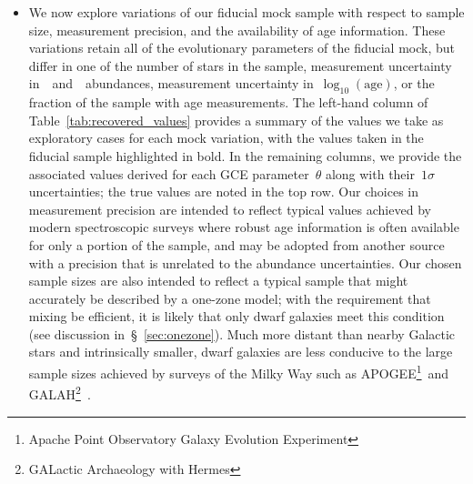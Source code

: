 \documentclass[ms.tex]{subfiles}
\begin{document}
\begin{itemize}

	\item We now explore variations of our fiducial mock sample with respect
	to sample size, measurement precision, and the availability of age
	information.
	These variations retain all of the evolutionary parameters of the fiducial
	mock, but differ in one of the number of stars in the sample, measurement
	uncertainty in~\feh~and~\afe~abundances, measurement uncertainty
	in~$\log_{10}(\text{age})$, or the fraction of the sample with age
	measurements.
	The left-hand column of Table~\ref{tab:recovered_values} provides a summary
	of the values we take as exploratory cases for each mock variation, with
	the values taken in the fiducial sample highlighted in bold.
	In the remaining columns, we provide the associated values derived for each
	GCE parameter~$\theta$ along with their~$1\sigma$ uncertainties; the true
	values are noted in the top row.
	Our choices in measurement precision are intended to reflect typical values
	achieved by modern spectroscopic surveys where robust age information is
	often available for only a portion of the sample, and may be adopted from
	another source with a precision that is unrelated to the abundance
	uncertainties.
	Our chosen sample sizes are also intended to reflect a typical sample that
	might accurately be described by a one-zone model; with the requirement
	that mixing be efficient, it is likely that only dwarf galaxies meet this
	condition (see discussion in~\S~\ref{sec:onezone}).
	Much more distant than nearby Galactic stars and intrinsically smaller,
	dwarf galaxies are less conducive to the large sample sizes achieved by
	surveys of the Milky Way such as APOGEE\footnote{
		Apache Point Observatory Galaxy Evolution Experiment
	}~\citep{Majewski2017}and GALAH\footnote{
		GALactic Archaeology with Hermes
	}~\citep{DeSilva2015, Martell2017}.


\end{itemize}
\end{document}
